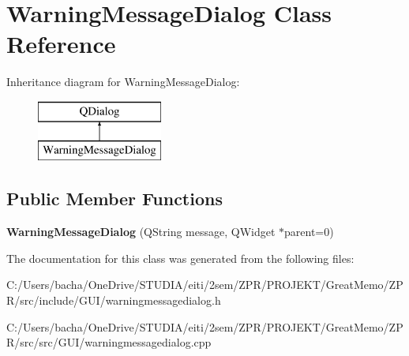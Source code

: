\hypertarget{class_warning_message_dialog}{}\section{Warning\+Message\+Dialog Class Reference}
\label{class_warning_message_dialog}
Inheritance diagram for Warning\+Message\+Dialog\+:\begin{figure}[H]
\begin{center}
\leavevmode
\includegraphics[height=2.000000cm]{class_warning_message_dialog}
\end{center}
\end{figure}
\subsection*{Public Member Functions}
\begin{DoxyCompactItemize}
\item 
\mbox{\label{class_warning_message_dialog_a313c65a3a592a1e7ff46c60e6f8c629a}} 
{\bfseries Warning\+Message\+Dialog} (Q\+String message, Q\+Widget $\ast$parent=0)
\end{DoxyCompactItemize}


The documentation for this class was generated from the following files\+:\begin{DoxyCompactItemize}
\item 
C\+:/\+Users/bacha/\+One\+Drive/\+S\+T\+U\+D\+I\+A/eiti/2sem/\+Z\+P\+R/\+P\+R\+O\+J\+E\+K\+T/\+Great\+Memo/\+Z\+P\+R/src/include/\+G\+U\+I/warningmessagedialog.\+h\item 
C\+:/\+Users/bacha/\+One\+Drive/\+S\+T\+U\+D\+I\+A/eiti/2sem/\+Z\+P\+R/\+P\+R\+O\+J\+E\+K\+T/\+Great\+Memo/\+Z\+P\+R/src/src/\+G\+U\+I/warningmessagedialog.\+cpp\end{DoxyCompactItemize}
